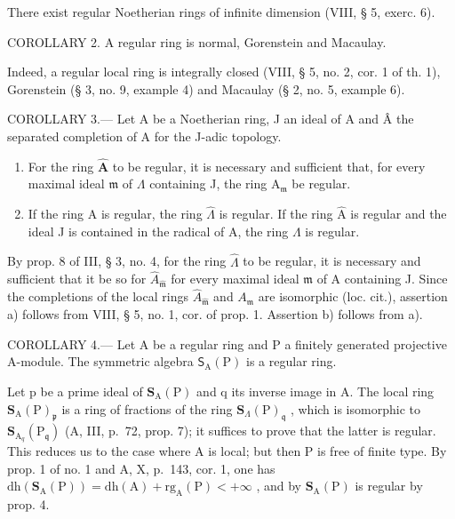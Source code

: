 There exist regular Noetherian rings of infinite dimension (VIII, § 5, exerc. 6).

COROLLARY 2. A regular ring is normal, Gorenstein and Macaulay.

Indeed, a regular local ring is integrally closed (VIII, § 5, no. 2, cor. 1 of th. 1), Gorenstein (§ 3, no. 9, example 4) and Macaulay (§ 2, no. 5, example 6).

COROLLARY 3.--- Let A be a Noetherian ring, J an ideal of A and Â the separated completion of A for the J-adic topology.

\begin{enumerate}
\def\labelenumi{\alph{enumi})}
\item
  For the ring \(\widehat{\mathbf{A}}\) to be regular, it is necessary and sufficient that, for every maximal ideal \(\mathfrak{m}\) of \(\Lambda\) containing J, the ring \(\mathrm{A}_{\mathfrak{m}}\) be regular.
\item
  If the ring A is regular, the ring \(\hat{\Lambda}\) is regular. If the ring \(\hat{\mathrm{A}}\) is regular and the ideal J is contained in the radical of A, the ring \(\Lambda\) is regular.
\end{enumerate}

By prop. 8 of III, § 3, no. 4, for the ring \(\widehat{\Lambda}\) to be regular, it is necessary and sufficient that it be so for \(\widehat{A}_{\widehat{\mathfrak{m}}}\) for every maximal ideal \(\mathfrak{m}\) of A containing J. Since the completions of the local rings \(\widehat{A}_{\widehat{\mathfrak{m}}}\) and \(A_{\mathfrak{m}}\) are isomorphic (loc. cit.), assertion a) follows from VIII, § 5, no. 1, cor. of prop. 1. Assertion b) follows from a).

COROLLARY 4.--- Let A be a regular ring and P a finitely generated projective A-module. The symmetric algebra \(\mathsf{S}_{\mathrm{A}}(\mathrm{P})\) is a regular ring.

Let p be a prime ideal of \(\mathbf{S}_{\mathrm{A}}(\mathrm{P})\) and q its inverse image in A. The local ring \(\mathbf{S}_{\mathrm{A}}(\mathrm{P})_{\mathfrak{p}}\) is a ring of fractions of the ring \(\mathbf{S}_{\Lambda}(\mathrm{P})_{\mathfrak{q}}\) , which is isomorphic to \(\mathbf{S}_{\mathrm{A}_{q}}(\mathrm{P}_{\mathfrak{q}})\) (A, III, p.~72, prop. 7); it suffices to prove that the latter is regular. This reduces us to the case where A is local; but then P is free of finite type. By prop. 1 of no. 1 and A, X, p.~143, cor. 1, one has \(\mathrm{dh}(\mathbf{S}_{\mathrm{A}}(\mathrm{P})) = \mathrm{dh}(\mathrm{A}) + \mathrm{rg}_{\mathrm{A}}(\mathrm{P}) < +\infty\) , and by \(\mathbf{S}_{\mathrm{A}}(\mathrm{P})\) is regular by prop. 4.

